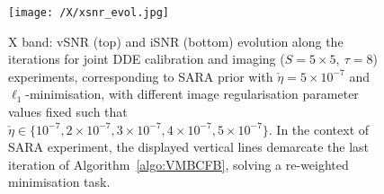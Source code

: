 \begin{figure}
\centering
\texttt{[image: /X/xsnr\_evol.jpg]}
\caption{X band: vSNR (top) and iSNR (bottom) evolution along the iterations for joint DDE calibration and imaging ($S=5\times 5,~\tau=8$) experiments, corresponding to SARA prior with $\check{\eta} =5\times 10^{-7}$ and $\ell_1$-minimisation, with different image regularisation parameter values fixed such that $\check{\eta} \in\{ 10^{-7},2\times 10^{-7},3\times 10^{-7},4\times10^{-7},5\times10^{-7}\}$. In the context of SARA experiment, the displayed vertical lines demarcate the last iteration of Algorithm~\ref{algo:VMBCFB}, solving a re-weighted minimisation task. }
\label{fig:xsnr}

\end{figure}